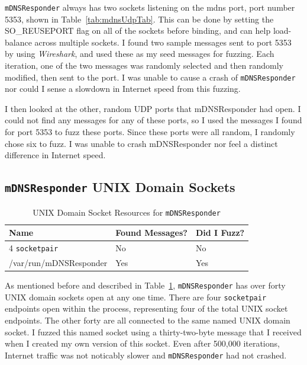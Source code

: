 \texttt{mDNSResponder} always has two sockets listening on the mdns port, port number 5353, shown in Table~\ref{tab:mdnsUdpTab}.  This can be done by setting the SO\_REUSEPORT flag on all of the sockets before binding, and can help load-balance across multiple sockets.  I found two sample messages sent to port 5353 by using \textit{Wireshark}, and used these as my seed messages for fuzzing.  Each iteration, one of the two messages was randomly selected and then randomly modified, then sent to the port.  I was unable to cause a crash of \texttt{mDNSResponder} nor could I sense a slowdown in Internet speed from this fuzzing.

I then looked at the other, random UDP ports that mDNSResponder had open.  I could not find any messages for any of these ports, so I used the messages I found for port 5353 to fuzz these ports.  Since these ports were all random, I randomly chose six to fuzz.  I was unable to crash mDNSResponder nor feel a distinct difference in Internet speed.

\subsection{\texttt{mDNSResponder} UNIX Domain Sockets}
\label{sec:mdnsUnix}

\begin{table}
\centering
\begin{normalsize}
\begin{tabular}{ l | l | l }
\textbf{Name} & \textbf{Found Messages?} & \textbf{Did I Fuzz?} \\ \hline
4 \texttt{socketpair} & No & No \\ \hline
/var/run/mDNSResponder & Yes & Yes \\ \hline
\end{tabular}
\caption{UNIX Domain Socket Resources for \texttt{mDNSResponder}}
\label{tab:mdnsUnixTab}
\end{normalsize}
\end{table} 

As mentioned before and described in Table~\ref{tab:mdnsUnixTab}, \texttt{mDNSResponder} has over forty UNIX domain sockets open at any one time.  There are four \texttt{socketpair} endpoints open within the process, representing four of the total UNIX socket endpoints.  The other forty are all connected to the same named UNIX domain socket.  I fuzzed this named socket using a thirty-two-byte message that I received when I created my own version of this socket.  Even after 500,000 iterations, Internet traffic was not noticably slower and \texttt{mDNSResponder} had not crashed.

